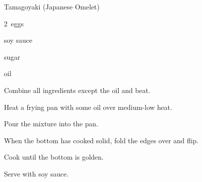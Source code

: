 \begin{recipe}{Tamagoyaki (Japanese Omelet)}{}{}

\begin{description}
\item 2~eggs
\item {} soy sauce
\item {} sugar
\item oil
\end{description}

\begin{directions}
\item Combine all ingredients except the oil and beat.
\item Heat a frying pan with some oil over medium-low heat.
\item Pour the mixture into the pan.
\item When the bottom has cooked solid, fold the edges over and flip.
\item Cook until the bottom is golden.
\item Serve with soy sauce.
\end{directions}

\end{recipe}
